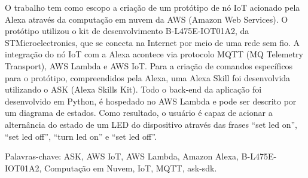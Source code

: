 \begin{resumo}
    O trabalho tem como escopo a criação de um protótipo de nó IoT acionado pela Alexa através da computação em nuvem da AWS (Amazon Web Services). O protótipo utilizou o kit de desenvolvimento B-L475E-IOT01A2, da STMicroelectronics, que se conecta na Internet por meio de uma rede sem fio. A integração do nó IoT com a Alexa acontece via protocolo MQTT (MQ Telemetry Transport), AWS Lambda e AWS IoT. Para a criação de comandos específicos para o protótipo, compreendidos pela Alexa, uma Alexa Skill foi desenvolvida utilizando o ASK (Alexa Skills Kit). Todo o back-end da aplicação foi desenvolvido em Python, é hospedado no AWS Lambda e pode ser descrito por um diagrama de estados. Como resultado, o usuário é capaz de acionar a alternância do estado de um LED do dispositivo através das frases ``set led on'', ``set led off'', ``turn led on'' e ``set led off''.

    Palavras-chave: ASK, AWS IoT, AWS Lambda, Amazon Alexa, B-L475E-IOT01A2, Computação em Nuvem, IoT, MQTT, ask-sdk.
\end{resumo}
